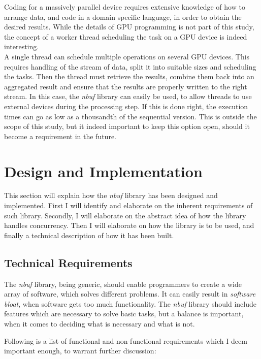 \documentclass[a4paper]{article}
\newcommand{\nbuf}{\textit{nbuf} }
\begin{document}
Coding for a massively parallel device requires extensive knowledge of how to arrange data, and code in a domain specific language, in order to obtain the desired results. While the details of GPU programming is not part of this study, the concept of a worker thread scheduling the task on a GPU device is indeed interesting.\\

A single thread can schedule multiple operations on several GPU devices. This requires handling of the stream of data, split it into suitable sizes and scheduling the tasks. Then the thread must retrieve the results, combine them back into an aggregated result and ensure that the results are properly written to the right stream. In this case, the \nbuf library can easily be used, to allow threads to use external devices during the processing step. If this is done right, the execution times can go as low as a thousandth of the sequential version. This is outside the scope of this study, but it indeed important to keep this option open, should it become a requirement in the future.





\newpage
\section{Design and Implementation}
This section will explain how the \nbuf library has been designed and implemented. First I will identify and elaborate on the inherent requirements of such library. Secondly, I will elaborate on the abstract idea of how the library handles concurrency. Then I will elaborate on how the library is to be used, and finally a technical description of how it has been built.


\subsection{Technical Requirements}
The \nbuf library, being generic, should enable programmers to create a wide array of software, which solves different problems. It can easily result in \textit{software bloat}, when software gets too much functionality. The \nbuf library should include features which are necessary to solve basic tasks, but a balance is important, when it comes to deciding what is necessary and what is not.

Following is a list of functional and non-functional requirements which I deem important enough, to warrant further discussion:
\end{document}
